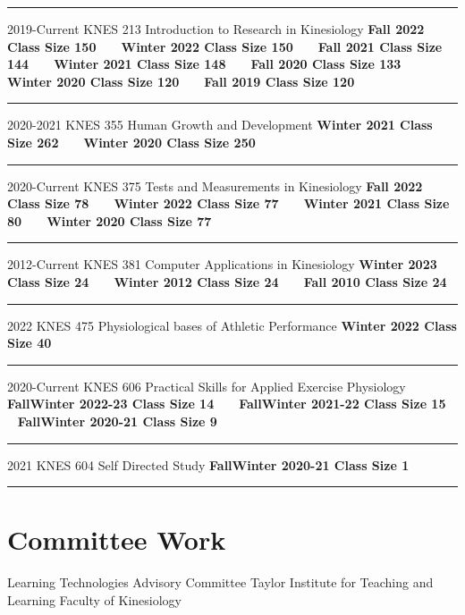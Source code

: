 \documentclass[]{friggeri-cv}
\begin{document}
\begin{entrylist}
\hrule
\entry
    {2019-Current}
    {KNES 213 \textendash Introduction to Research in Kinesiology}
    {\textbf{Fall 2022 Class Size 150}}
    {}
\entry
    {~}
    {~}
    {\textbf{Winter 2022 Class Size 150}}
    {}
\entry
    {~}
    {~}
    {\textbf{Fall 2021 Class Size 144}}
    {}
\entry
    {~}
    {~}
    {\textbf{Winter 2021 Class Size 148}}
    {}
\entry
    {~}
    {~}
    {\textbf{Fall 2020 Class Size 133}}
    {}
\entry
    {~}
    {~}
    {\textbf{Winter 2020 Class Size 120}}
    {}
\entry
    {~}
    {~}
    {\textbf{Fall 2019 Class Size 120}}
    {}\hrule
\entry
    {2020-2021}
    {KNES 355 \textendash Human Growth and Development}
    {\textbf{Winter 2021 \textendash Class Size 262}}
    {}
\entry
    {~}
    {~}
    {\textbf{Winter 2020 \textendash Class Size 250}}
    {}
\hrule
\entry
    {2020-Current}
    {KNES 375 \textendash Tests and Measurements in Kinesiology}
    {\textbf{Fall 2022 \textendash Class Size 78}}  
    {}
\entry
    {~}
    {~}
    {\textbf{Winter 2022 \textendash Class Size 77}}
    {}
\entry
    {~}
    {~}
    {\textbf{Winter 2021 \textendash Class Size 80}}
    {}
\entry
    {~}
    {~}
    {\textbf{Winter 2020 \textendash Class Size 77}}
    {}
\hrule
\entry
    {2012-Current}
    {KNES 381 \textendash Computer Applications in Kinesiology}
    {\textbf{Winter 2023 \textendash Class Size 24}}
    {}
\entry
    {~}
    {~}
    {\textbf{Winter 2012 \textendash Class Size 24}}
    {}
\entry
    {~}
    {~}
    {\textbf{Fall 2010 \textendash Class Size 24}}
    {}
\hrule
\entry
    {2022}
    {KNES 475 \textendash Physiological bases of Athletic Performance}
    {\textbf{Winter 2022 \textendash Class Size 40}}
    {}
\hrule

\entry    
    {2020-Current}
    {KNES 606 \textendash Practical Skills for Applied Exercise Physiology}
    {\textbf{Fall\textendash Winter 2022-23 \textendash Class Size 14}}
    {}
    {}
\entry
    {~}
    {~}
    {\textbf{Fall\textendash Winter 2021-22 \textendash Class Size 15}}
    {}
    {}
\entry
    {~}
    {~}
    {\textbf{Fall\textendash Winter 2020-21 \textendash Class Size 9}}
    {}
\hrule
\entry
    {2021}
    {KNES 604 \textendash Self Directed Study}
    {\textbf{Fall\textendash Winter 2020-21 \textendash Class Size 1}}
    {}
    \hrule
\end{entrylist}
\section {Committee Work}
{Learning Technologies Advisory Committee}
{Taylor Institute for Teaching and Learning}
{Faculty of Kinesiology}
\end{document}
